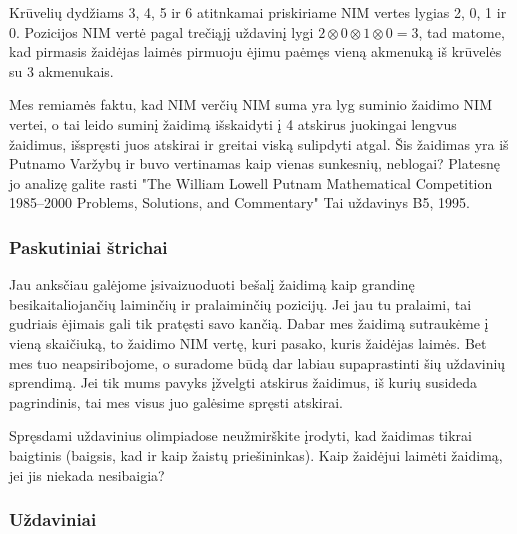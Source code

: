 Krūvelių dydžiams 3, 4, 5 ir 6 atitnkamai priskiriame NIM vertes lygias 2, 0, 1
ir 0. Pozicijos NIM vertė pagal trečiąjį uždavinį lygi $2\otimes 0\otimes
1\otimes 0=3$, tad matome, kad pirmasis žaidėjas laimės pirmuoju ėjimu paėmęs
vieną akmenuką iš krūvelės su 3 akmenukais. 

\begin{pastaba}
  Mes remiamės faktu, kad NIM verčių NIM suma yra lyg suminio žaidimo NIM
  vertei, o tai leido suminį žaidimą išskaidyti į 4 atskirus juokingai lengvus
  žaidimus, išspręsti juos atskirai ir greitai viską sulipdyti atgal. Šis
  žaidimas yra iš Putnamo Varžybų ir buvo vertinamas kaip vienas sunkesnių,
  neblogai? Platesnę jo analizę galite rasti "The William Lowell Putnam
  Mathematical Competition 1985–2000 Problems, Solutions, and Commentary" Tai
  uždavinys B5, 1995.  
\end{pastaba}

\subsubsection{Paskutiniai štrichai}

\begin{pastaba}
  Jau anksčiau galėjome įsivaizuoduoti bešalį žaidimą kaip grandinę
  besikaitaliojančių laiminčių ir pralaiminčių pozicijų. Jei jau tu pralaimi, tai
  gudriais ėjimais gali tik pratęsti savo kančią. Dabar mes žaidimą sutraukėme į
  vieną skaičiuką, to žaidimo NIM vertę, kuri pasako, kuris žaidėjas laimės. Bet
  mes tuo neapsiribojome, o suradome būdą dar labiau supaprastinti šių uždavinių
  sprendimą. Jei tik mums pavyks įžvelgti atskirus žaidimus, iš kurių susideda
  pagrindinis, tai mes visus juo galėsime spręsti atskirai. 
\end{pastaba}

\begin{pastaba}
  Spręsdami uždavinius olimpiadose neužmirškite įrodyti, kad žaidimas tikrai
  baigtinis (baigsis, kad ir kaip žaistų priešininkas). Kaip žaidėjui laimėti
  žaidimą, jei jis niekada nesibaigia?
\end{pastaba}

\subsubsection{Uždaviniai}

